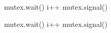 \documentclass[varwidth=28em,crop]{standalone}
\begin{document}
\begin{minipage}{.3\linewidth}
\vspace{1em}
\begin{pythoncode}
mutex.wait() 
    i++ 
mutex.signal() 
\end{pythoncode}
\end{minipage}\qquad
\begin{minipage}{.3\linewidth}
\vspace{1em}
\begin{pythoncode}
mutex.wait() 
    i++ 
mutex.signal() 
\end{pythoncode}
\end{minipage}
\end{document}
